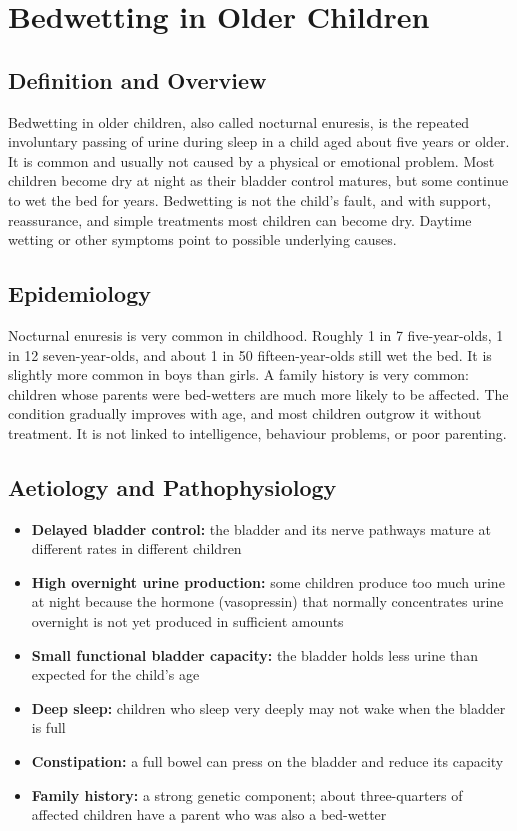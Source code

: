 \chapter{Bedwetting in Older Children}

\section*{Definition and Overview}
Bedwetting in older children, also called nocturnal enuresis, is the repeated involuntary passing of urine during sleep in a child aged about five years or older. It is common and usually not caused by a physical or emotional problem. Most children become dry at night as their bladder control matures, but some continue to wet the bed for years. Bedwetting is not the child's fault, and with support, reassurance, and simple treatments most children can become dry. Daytime wetting or other symptoms point to possible underlying causes.

\section*{Epidemiology}
Nocturnal enuresis is very common in childhood. Roughly 1 in 7 five-year-olds, 1 in 12 seven-year-olds, and about 1 in 50 fifteen-year-olds still wet the bed. It is slightly more common in boys than girls. A family history is very common: children whose parents were bed-wetters are much more likely to be affected. The condition gradually improves with age, and most children outgrow it without treatment. It is not linked to intelligence, behaviour problems, or poor parenting.

\section*{Aetiology and Pathophysiology}
\begin{itemize}
    \item \textbf{Delayed bladder control:} the bladder and its nerve pathways mature at different rates in different children
    \item \textbf{High overnight urine production:} some children produce too much urine at night because the hormone (vasopressin) that normally concentrates urine overnight is not yet produced in sufficient amounts
    \item \textbf{Small functional bladder capacity:} the bladder holds less urine than expected for the child's age
    \item \textbf{Deep sleep:} children who sleep very deeply may not wake when the bladder is full
    \item \textbf{Constipation:} a full bowel can press on the bladder and reduce its capacity
    \item \textbf{Family history:} a strong genetic component; about three-quarters of affected children have a parent who was also a bed-wetter
\end{itemize}

